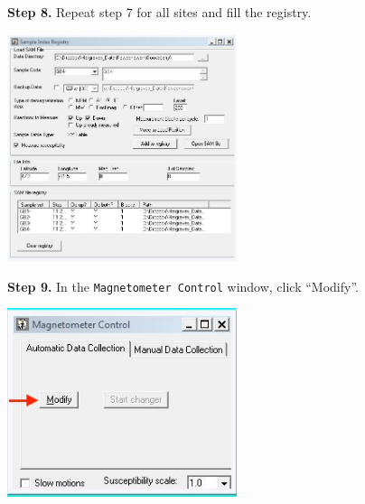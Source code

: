 \documentclass[11pt,letterpaper]{article}
\begin{document}
\begin{figure}
\begin{flushleft}
\textbf{Step 8.}
Repeat step 7 for all sites and fill the registry.
\end{flushleft}
\centering
\includegraphics[width=0.6\textwidth]{images/Capture8.jpg}
\end{figure}

\begin{figure}
\begin{flushleft}
\textbf{Step 9.}
In the \texttt{Magnetometer Control} window, click ``Modify''.
\end{flushleft}
\centering
\includegraphics[width=0.6\textwidth]{images/Capture9.jpg}
\end{figure}
\end{document}

